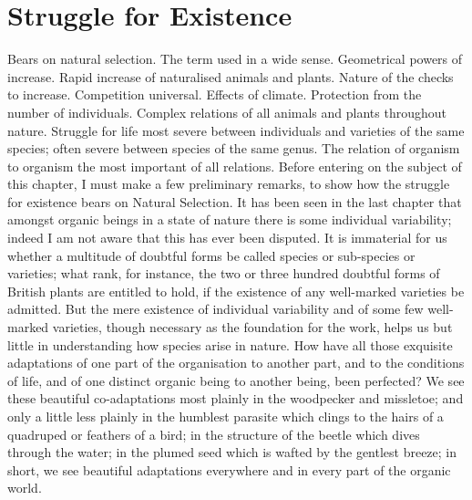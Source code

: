 \chapter{Struggle for Existence}
Bears on natural selection. The term used in a wide sense. Geometrical powers of increase. Rapid increase of naturalised animals and plants. Nature of the checks to increase. Competition universal. Effects of climate. Protection from the number of individuals. Complex relations of all animals and plants throughout nature. Struggle for life most severe between individuals and varieties of the same species; often severe between species of the same genus. The relation of organism to organism the most important of all relations.
Before entering on the subject of this chapter, I must make a few preliminary remarks, to show how the struggle for existence bears on Natural Selection. It has been seen in the last chapter that amongst organic beings in a state of nature there is some individual variability; indeed I am not aware that this has ever been disputed. It is immaterial for us whether a multitude of doubtful forms be called species or sub-species or varieties; what rank, for instance, the two or three hundred doubtful forms of British plants are entitled to hold, if the existence of any well-marked varieties be admitted. But the mere existence of individual variability and of some few well-marked varieties, though necessary as the foundation for the work, helps us but little in understanding how species arise in nature. How have all those exquisite adaptations of one part of the organisation to another part, and to the conditions of life, and of one distinct organic being to another being, been perfected? We see these beautiful co-adaptations most plainly in the woodpecker and missletoe; and only a little less plainly in the humblest parasite which clings to the hairs of a quadruped or feathers of a bird; in the structure of the beetle which dives through the water; in the plumed seed which is wafted by the gentlest breeze; in short, we see beautiful adaptations everywhere and in every part of the organic world.

